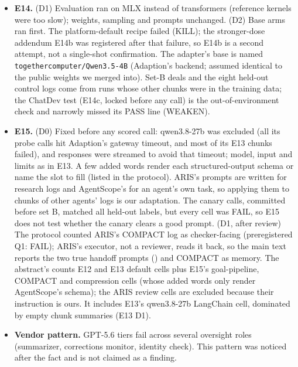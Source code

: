 \documentclass[11pt]{article}
\begin{document}
\begin{itemize}
\item \textbf{E14.} (D1) Evaluation ran on MLX instead of transformers (reference kernels were too slow); weights, sampling and prompts unchanged. (D2) Base arms ran first. The platform-default recipe failed (KILL); the stronger-dose addendum E14b was registered after that failure, so E14b is a second attempt, not a single-shot confirmation. The adapter's base is named \texttt{togethercomputer/Qwen3.5-4B} (Adaption's backend; assumed identical to the public weights we merged into). Set-B deals and the eight held-out control logs come from runs whose other chunks were in the training data; the ChatDev test (E14c, locked before any call) is the out-of-environment check and narrowly missed its PASS line (WEAKEN).
\item \textbf{E15.} (D0) Fixed before any scored call: qwen3.8-27b was excluded (all its probe calls hit Adaption's gateway timeout, and most of its E13 chunks failed), and responses were streamed to avoid that timeout; model, input and limits as in E13. A few added words render each structured-output schema or name the slot to fill (listed in the protocol). ARIS's prompts are written for research logs and AgentScope's for an agent's own task, so applying them to chunks of other agents' logs is our adaptation. The canary calls, committed before set B, matched all  held-out labels, but every cell was FAIL, so E15 does not test whether the canary clears a good prompt. (D1, after review) The protocol counted ARIS's COMPACT log as checker-facing (preregistered Q1:  FAIL); ARIS's executor, not a reviewer, reads it back, so the main text reports the two true handoff prompts () and COMPACT as memory. The abstract's  counts E12 and E13 default cells plus E15's goal-pipeline, COMPACT and compression cells (whose added words only render AgentScope's schema); the ARIS review cells are excluded because their instruction is ours. It includes E13's qwen3.8-27b LangChain cell, dominated by empty chunk summaries (E13 D1).
\item \textbf{Vendor pattern.} GPT-5.6 tiers fail across several oversight roles (summarizer, corrections monitor, identity check). This pattern was noticed after the fact and is not claimed as a finding.
\end{itemize}
\end{document}
